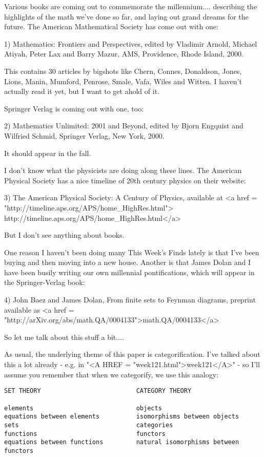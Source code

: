 

Various books are coming out to commemorate the millennium.... describing
the highlights of the math we've done so far, and laying out grand dreams 
for the future.  The American Mathematical Society has come out with one:

1) Mathematics: Frontiers and Perspectives, edited by Vladimir Arnold, 
Michael Atiyah, Peter Lax and Barry Mazur, AMS, Providence, Rhode 
Island, 2000.  

This contains 30 articles by bigshots like Chern, Connes, Donaldson,
Jones, Lions, Manin, Mumford, Penrose, Smale, Vafa, Wiles and Witten.
I haven't actually read it yet, but I want to get ahold of it.  

Springer Verlag is coming out with one, too:

2) Mathematics Unlimited: 2001 and Beyond, edited by Bjorn Engquist
and Wilfried Schmid, Springer Verlag, New York, 2000.  

It should appear in the fall.  

I don't know what the physicists are doing along these lines.  The 
American Physical Society has a nice timeline of 20th century physics 
on their website:

3) The American Physical Society: A Century of Physics, available
at <a href = "http://timeline.aps.org/APS/home_HighRes.html">
http://timeline.aps.org/APS/home_HighRes.html</a>

But I don't see anything about books.

One reason I haven't been doing many This Week's Finds lately is
that I've been buying and then moving into a new house.  Another
is that James Dolan and I have been busily writing our own millennial 
pontifications, which will appear in the Springer-Verlag book:

4) John Baez and James Dolan, From finite sets to Feynman diagrams,
preprint available as <a href = "http://arXiv.org/abs/math.QA/0004133">math.QA/0004133</a>

So let me talk about this stuff a bit....

As usual, the underlying theme of this paper is categorification.  
I've talked about this a lot already - e.g. in "<A HREF = "week121.html">week121</A>" - so I'll
assume you remember that when we categorify, we use this analogy:

\begin{verbatim}
SET THEORY                          CATEGORY THEORY

elements                            objects                       
equations between elements          isomorphisms between objects        
sets                                categories                    
functions                           functors                      
equations between functions         natural isomorphisms between functors  
\end{verbatim}
    
